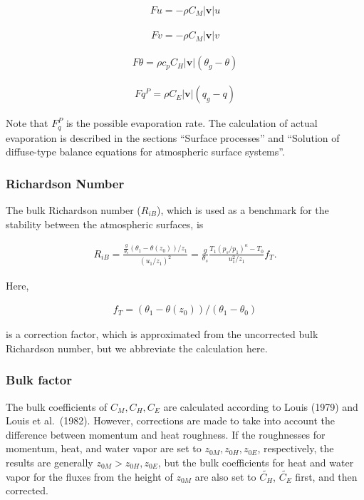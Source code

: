 \begin{eqnarray}
Fu  =  - \rho C_M |{\mathbf{v}}| u
\end{eqnarray}

\begin{eqnarray}
Fv  =  - \rho C_M |{\mathbf{v}}| v
\end{eqnarray}

\begin{eqnarray}
F\theta  = \rho c_p C_H |{\mathbf{v}}| ( \theta_g - \theta )
\end{eqnarray}

\begin{eqnarray}
Fq^P =  \rho C_E |{\mathbf{v}}| ( q_g - q )
\end{eqnarray}

Note that \(F_q^P\) is the possible evaporation rate. The calculation of
actual evaporation is described in the sections ``Surface processes''
and ``Solution of diffuse-type balance equations for atmospheric surface
systems''.

\hypertarget{richardson-number}{%
\subsubsection{Richardson Number}\label{richardson-number}}

The bulk Richardson number (\(R_{iB}\)), which is used as a benchmark
for the stability between the atmospheric surfaces, is

\begin{eqnarray}
R_{iB} = \frac{ \frac{g}{\theta_s} (\theta_1 - \theta(z_0))/z_1 }
              { (u_1/z_1)^2                                  }
       = \frac{g}{\theta_s}
         \frac{T_1 (p_s/p_1)^\kappa - T_0 }{u_1^2/z_1} f_T .
\end{eqnarray}

Here,

\begin{eqnarray}
f_T = (\theta_1 - \theta(z_0))/(\theta_1 - \theta_0)
\end{eqnarray}

is a correction factor, which is approximated from the uncorrected bulk
Richardson number, but we abbreviate the calculation here.

\hypertarget{bulk-factor}{%
\subsubsection{Bulk factor}\label{bulk-factor}}

The bulk coefficients of \(C_M,C_H,C_E\) are calculated according to
Louis (1979) and Louis et al.~(1982). However, corrections are made to
take into account the difference between momentum and heat roughness. If
the roughnesses for momentum, heat, and water vapor are set to
\(z_{0M}, z_{0H}, z_{0E}\), respectively, the results are generally
\(z_{0M} > z_{0H}, z_{0E}\), but the bulk coefficients for heat and
water vapor for the fluxes from the height of \(z_{0M}\) are also set to
\(\widetilde{C_H}\), \(\widetilde{C_E}\) first, and then corrected.

